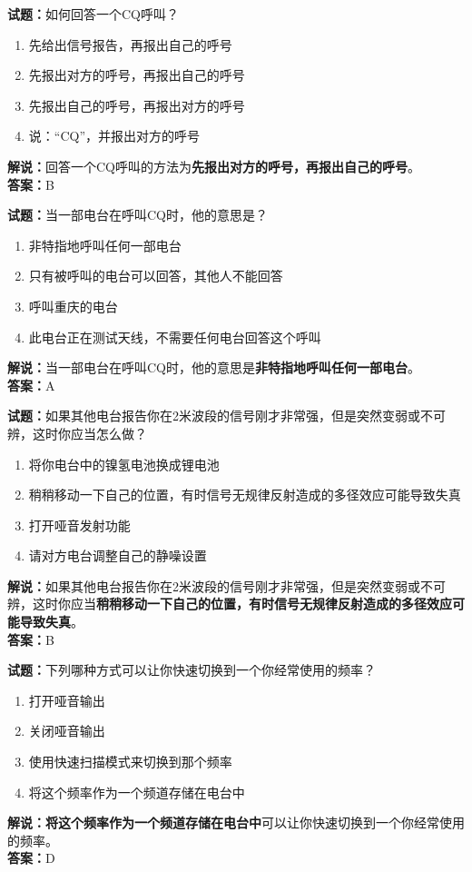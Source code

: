 \documentclass{ctexbook}
\begin{document}
\bigskip


\noindent\textbf{试题：}如何回答一个CQ呼叫？
\begin{enumerate}[leftmargin=3em]
	\item 先给出信号报告，再报出自己的呼号
	\item 先报出对方的呼号，再报出自己的呼号
	\item 先报出自己的呼号，再报出对方的呼号
	\item 说：“CQ”，并报出对方的呼号
\end{enumerate}
\noindent\textbf{解说：}回答一个CQ呼叫的方法为\textbf{先报出对方的呼号，再报出自己的呼号}。\\\noindent\textbf{答案：}B


\bigskip


\noindent\textbf{试题：}当一部电台在呼叫CQ时，他的意思是？
\begin{enumerate}[leftmargin=3em]
	\item 非特指地呼叫任何一部电台
	\item 只有被呼叫的电台可以回答，其他人不能回答
	\item 呼叫重庆的电台
	\item 此电台正在测试天线，不需要任何电台回答这个呼叫
\end{enumerate}
\noindent\textbf{解说：}当一部电台在呼叫CQ时，他的意思是\textbf{非特指地呼叫任何一部电台}。\\\noindent\textbf{答案：}A


\bigskip


\noindent\textbf{试题：}如果其他电台报告你在2米波段的信号刚才非常强，但是突然变弱或不可辨，这时你应当怎么做？
\begin{enumerate}[leftmargin=3em]
	\item 将你电台中的镍氢电池换成锂电池
	\item 稍稍移动一下自己的位置，有时信号无规律反射造成的多径效应可能导致失真
	\item 打开哑音发射功能
	\item 请对方电台调整自己的静噪设置
\end{enumerate}
\noindent\textbf{解说：}如果其他电台报告你在2米波段的信号刚才非常强，但是突然变弱或不可辨，这时你应当\textbf{稍稍移动一下自己的位置，有时信号无规律反射造成的多径效应可能导致失真}。\\\noindent\textbf{答案：}B


\bigskip


\noindent\textbf{试题：}下列哪种方式可以让你快速切换到一个你经常使用的频率？
\begin{enumerate}[leftmargin=3em]
	\item 打开哑音输出
	\item 关闭哑音输出
	\item 使用快速扫描模式来切换到那个频率
	\item 将这个频率作为一个频道存储在电台中
\end{enumerate}
\noindent\textbf{解说：}\textbf{将这个频率作为一个频道存储在电台中}可以让你快速切换到一个你经常使用的频率。\\\noindent\textbf{答案：}D
\end{document}

